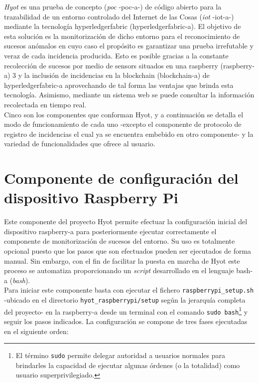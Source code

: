 \documentclass[12pt,a4paper, twoside]{report}
\begin{document}
	\textit{Hyot} es una prueba de concepto (\textit{\gls{poc}} -\gls{poc-a}-) de código abierto para la trazabilidad de un entorno controlado del Internet de las Cosas (\textit{\gls{iot}} -\gls{iot-a}-) mediante la tecnología \gls{hyperledgerfabric} (\gls{hyperledgerfabric-a}). El objetivo de esta solución es la monitorización de dicho entorno para el reconocimiento de sucesos anómalos en cuyo caso el propósito es garantizar una prueba irrefutable y veraz de cada incidencia producida. Esto es posible gracias a la constante recolección de sucesos por medio de \glspl{sensor} situados en una \gls{raspberry} (\gls{raspberry-a}) 3 y la inclusión de incidencias en la \Gls{blockchain} (\gls{blockchain-a}) de \gls{hyperledgerfabric-a} aprovechando de tal forma las ventajas que brinda esta tecnología. Asimismo, mediante un sistema web se puede consultar la información recolectada en tiempo real. \\
	
	 Cinco son los componentes que conforman Hyot, y a continuación se detalla el modo de funcionamiento de cada uno -excepto el componente de protocolo de registro de incidencias el cual ya se encuentra embebido en otro componente- y la variedad de funcionalidades que ofrece al usuario.
	 
	 \section{Componente de configuración del dispositivo Raspberry Pi}
	 
	 Este componente del proyecto Hyot permite efectuar la configuración inicial del dispositivo \gls{raspberry-a} para posteriormente ejecutar correctamente el componente de monitorización de sucesos del entorno. Su uso es totalmente opcional puesto que los pasos que son efectuados pueden ser ejecutados de forma manual. Sin embargo, con el fin de facilitar la puesta en marcha de Hyot este proceso se automatiza proporcionando un \textit{\gls{script}} desarrollado en el lenguaje \gls{bash-a} (\textit{\gls{bash}}). \\
	 
	Para iniciar este componente basta con ejecutar el fichero \texttt{raspberrypi\_setup.sh} -ubicado en el directorio \texttt{hyot\_raspberrypi/setup} según la jerarquía completa del proyecto- en la \gls{raspberry-a} desde un terminal con el comando \texttt{sudo bash}\footnote{El término \texttt{sudo} permite delegar autoridad a usuarios normales para brindarles la capacidad de ejecutar algunas órdenes (o la totalidad) como usuario superprivilegiado.} y seguir los pasos indicados. La configuración se compone de tres fases ejecutadas en el siguiente orden:
	
\end{document}

